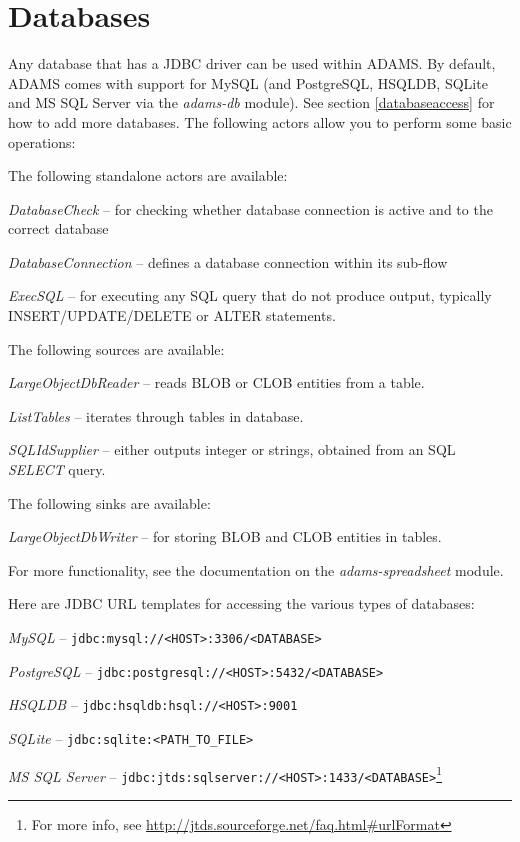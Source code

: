 \newpage
\section{Databases}
Any database that has a JDBC driver can be used within ADAMS. By default,
ADAMS comes with support for MySQL (and PostgreSQL, HSQLDB, SQLite and MS SQL
Server via the \textit{adams-db} module).
See section \ref{databaseaccess} for how to add more databases. The following
actors allow you to perform some basic operations:

\noindent The following standalone actors are available:
\begin{tight_itemize}
  \item \textit{DatabaseCheck} -- for checking whether database connection is active and to the correct database
  \item \textit{DatabaseConnection} -- defines a database connection within its sub-flow
  \item \textit{ExecSQL} -- for executing any SQL query that do not produce output, typically INSERT/UPDATE/DELETE
  or ALTER statements.
\end{tight_itemize}

\noindent The following sources are available:
\begin{tight_itemize}
  \item \textit{LargeObjectDbReader} -- reads BLOB or CLOB entities from a table.
  \item \textit{ListTables} -- iterates through tables in database.
  \item \textit{SQLIdSupplier} -- either outputs integer or strings, obtained from an SQL \textit{SELECT} query.
\end{tight_itemize}

\noindent The following sinks are available:
\begin{tight_itemize}
  \item \textit{LargeObjectDbWriter} -- for storing BLOB and CLOB entities in tables.
\end{tight_itemize}

For more functionality, see the documentation on the \textit{adams-spreadsheet}
module.

\noindent Here are JDBC URL templates for accessing the various types of databases:
\begin{tight_itemize}
  \item \textit{MySQL} -- \texttt{jdbc:mysql://<HOST>:3306/<DATABASE>}
  \item \textit{PostgreSQL} -- \texttt{jdbc:postgresql://<HOST>:5432/<DATABASE>}
  \item \textit{HSQLDB} -- \texttt{jdbc:hsqldb:hsql://<HOST>:9001}
  \item \textit{SQLite} -- \texttt{jdbc:sqlite:<PATH\_TO\_FILE>}
  \item \textit{MS SQL Server} -- \texttt{jdbc:jtds:sqlserver://<HOST>:1433/<DATABASE>}\footnote{For more info, see \url{http://jtds.sourceforge.net/faq.html\#urlFormat}{}}
\end{tight_itemize}

